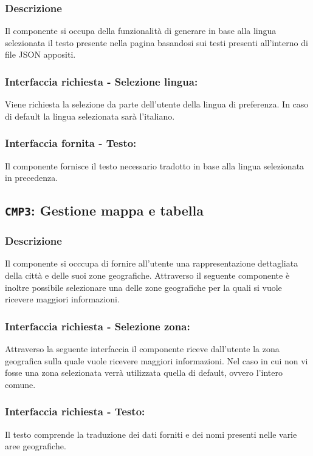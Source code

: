         \subsubsection{Descrizione} 
            Il componente si occupa della funzionalità di generare in base alla lingua selezionata il testo presente nella pagina basandosi sui testi presenti all'interno di file JSON appositi.
        \subsubsection{Interfaccia richiesta - Selezione lingua:}
            Viene richiesta la selezione da parte dell'utente della lingua di preferenza.
            In caso di default la lingua selezionata sarà l'italiano.
        \subsubsection{Interfaccia fornita - Testo:}
            Il componente fornisce il testo necessario tradotto in base alla lingua selezionata in precedenza.

    \subsection{\texttt{CMP3}: Gestione mappa e tabella}
        \subsubsection{Descrizione}
            Il componente si occcupa di fornire all'utente una rappresentazione dettagliata della città e delle suoi zone geografiche. Attraverso il seguente componente è inoltre possibile selezionare una delle zone geografiche per la quali si vuole ricevere maggiori informazioni. 
        \subsubsection{Interfaccia richiesta - Selezione zona:}
            Attraverso la seguente interfaccia il componente riceve dall'utente la zona geografica sulla quale vuole ricevere maggiori informazioni. Nel caso in cui non vi fosse una zona selezionata verrà utilizzata quella di default, ovvero l'intero comune.
        \subsubsection{Interfaccia richiesta - Testo:}
            Il testo comprende la traduzione dei dati forniti e dei nomi presenti nelle varie aree geografiche.
